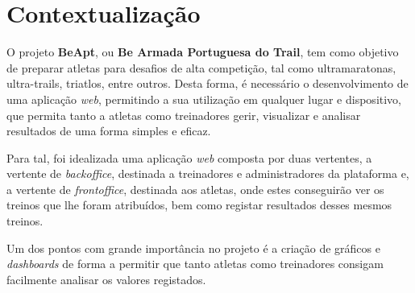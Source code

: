 \section{Contextualização}

O projeto \textbf{BeApt}, ou \textbf{Be Armada Portuguesa do Trail}, tem como objetivo de preparar atletas para desafios de alta competição, tal como ultramaratonas, ultra-trails, triatlos, entre outros. Desta forma, é necessário o desenvolvimento de uma aplicação \textit{web}, permitindo a sua utilização em qualquer lugar e dispositivo, que permita tanto a atletas como treinadores gerir, visualizar e analisar resultados de uma forma simples e eficaz.

Para tal, foi idealizada uma aplicação \textit{web} composta por duas vertentes, a vertente de \textit{backoffice}, destinada a treinadores e administradores da plataforma e, a vertente de \textit{frontoffice}, destinada aos atletas, onde estes conseguirão ver os treinos que lhe foram atribuídos, bem como registar resultados desses mesmos treinos.

Um dos pontos com grande importância no projeto é a criação de gráficos e \textit{dashboards} de forma a permitir que tanto atletas como treinadores consigam facilmente analisar os valores registados.